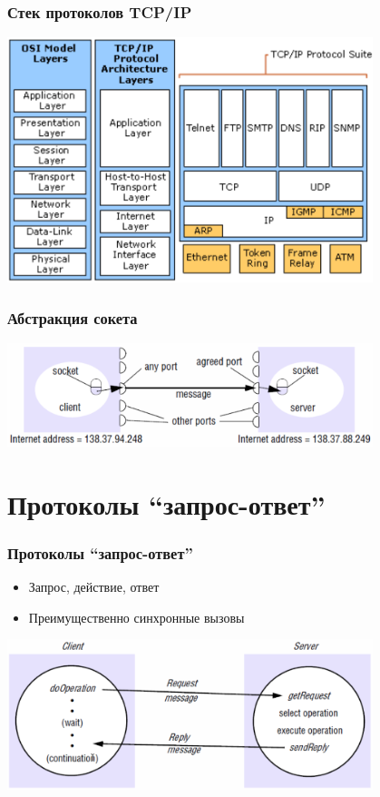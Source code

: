 \documentclass[xetex,mathserif,serif]{beamer}
\begin{document}
	\begin{frame}
		\frametitle{Стек протоколов TCP/IP}
		\begin{center}
			\includegraphics[width=0.8\textwidth]{tcpIpStack.png}
		\end{center}
	\end{frame}

	\begin{frame}
		\frametitle{Абстракция сокета}
		\begin{center}
			\includegraphics[width=0.8\textwidth]{sockets.png}
		\end{center}
	\end{frame}

	\section{Протоколы ``запрос-ответ''}

	\begin{frame}
		\frametitle{Протоколы ``запрос-ответ''}
		\begin{itemize}
			\item Запрос, действие, ответ
			\item Преимущественно синхронные вызовы
		\end{itemize}
		\begin{center}
			\includegraphics[width=0.8\textwidth]{requestReplyProtocols.png}
		\end{center}
	\end{frame}
\end{document}
